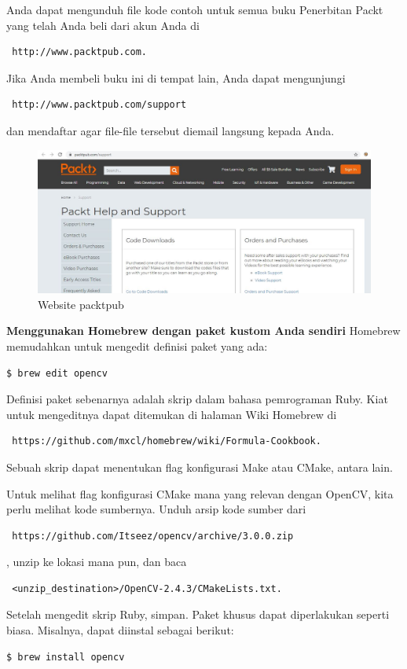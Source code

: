 \begin{enumerate}
\begin{enumerate}
Anda dapat mengunduh file kode contoh untuk semua buku Penerbitan Packt yang telah Anda beli dari akun Anda di \begin{verbatim} http://www.packtpub.com.\end{verbatim} Jika Anda membeli buku ini di tempat lain, Anda dapat mengunjungi \begin{verbatim} http://www.packtpub.com/support\end{verbatim} dan mendaftar agar file-file tersebut diemail langsung kepada Anda.
		\begin{figure}[ht]
		\centering
		\includegraphics[scale=0.4]{figures/1,14.jpg}
		\caption{Website packtpub}
		\label{contoh}
		\end{figure}

\textbf{Menggunakan Homebrew dengan paket kustom Anda sendiri}
\newline
Homebrew memudahkan untuk mengedit definisi paket yang ada:
\begin{verbatim} 
$ brew edit opencv
\end{verbatim}

Definisi paket sebenarnya adalah skrip dalam bahasa pemrograman Ruby. Kiat untuk mengeditnya dapat ditemukan di halaman Wiki Homebrew di \begin{verbatim} https://github.com/mxcl/homebrew/wiki/Formula-Cookbook. \end{verbatim} Sebuah skrip dapat menentukan flag konfigurasi Make atau CMake, antara lain.

Untuk melihat flag konfigurasi CMake mana yang relevan dengan OpenCV, kita perlu melihat kode sumbernya. Unduh arsip kode sumber dari \begin{verbatim} https://github.com/Itseez/opencv/archive/3.0.0.zip \end{verbatim}, unzip ke lokasi mana pun, dan baca \begin{verbatim} <unzip_destination>/OpenCV-2.4.3/CMakeLists.txt. \end{verbatim}
Setelah mengedit skrip Ruby, simpan.
Paket khusus dapat diperlakukan seperti biasa. Misalnya, dapat diinstal sebagai berikut:
\begin{verbatim} 
$ brew install opencv
\end{verbatim}



\end{enumerate}
\end{enumerate}
